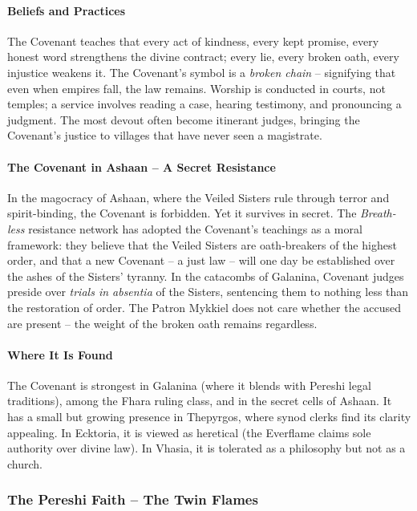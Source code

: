 \paragraph{Beliefs and Practices}
The Covenant teaches that every act of kindness, every kept promise, every honest word strengthens the divine contract; every lie, every broken oath, every injustice weakens it. The Covenant's symbol is a \textit{broken chain} -- signifying that even when empires fall, the law remains. Worship is conducted in courts, not temples; a service involves reading a case, hearing testimony, and pronouncing a judgment. The most devout often become itinerant judges, bringing the Covenant's justice to villages that have never seen a magistrate.

\paragraph{The Covenant in Ashaan -- A Secret Resistance}
In the magocracy of Ashaan, where the Veiled Sisters rule through terror and spirit-binding, the Covenant is forbidden. Yet it survives in secret. The \textit{Breath-less} resistance network has adopted the Covenant's teachings as a moral framework: they believe that the Veiled Sisters are oath-breakers of the highest order, and that a new Covenant -- a just law -- will one day be established over the ashes of the Sisters' tyranny. In the catacombs of Galanina, Covenant judges preside over \textit{trials in absentia} of the Sisters, sentencing them to nothing less than the restoration of order. The Patron Mykkiel does not care whether the accused are present -- the weight of the broken oath remains regardless.

\paragraph{Where It Is Found}
The Covenant is strongest in Galanina (where it blends with Pereshi legal traditions), among the Fhara ruling class, and in the secret cells of Ashaan. It has a small but growing presence in Thepyrgos, where synod clerks find its clarity appealing. In Ecktoria, it is viewed as heretical (the Everflame claims sole authority over divine law). In Vhasia, it is tolerated as a philosophy but not as a church.

\subsubsection{The Pereshi Faith -- The Twin Flames}
\label{sec:twin-flames}

